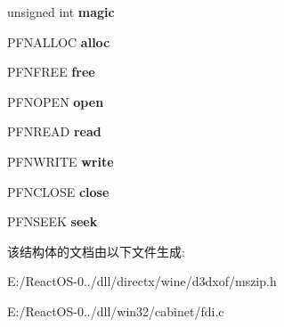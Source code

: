 \begin{DoxyCompactItemize}
\mbox{\label{struct_f_d_i___int_a4dd5be65da967f1874ed28a34d75d856}} 
unsigned int {\bfseries magic}
\item 
\mbox{\label{struct_f_d_i___int_abb67b91c719deb9cdd6ab63e285dd65d}} 
P\+F\+N\+A\+L\+L\+OC {\bfseries alloc}
\item 
\mbox{\label{struct_f_d_i___int_a90057249b8c1b5f56a0779f14433a822}} 
P\+F\+N\+F\+R\+EE {\bfseries free}
\item 
\mbox{\label{struct_f_d_i___int_a00f117b20e15d917435de14d3715902d}} 
P\+F\+N\+O\+P\+EN {\bfseries open}
\item 
\mbox{\label{struct_f_d_i___int_ae523a56a3a8e308727998f71ab767ed6}} 
P\+F\+N\+R\+E\+AD {\bfseries read}
\item 
\mbox{\label{struct_f_d_i___int_a0f2790827a1dda7f74e728a1bdb71b2e}} 
P\+F\+N\+W\+R\+I\+TE {\bfseries write}
\item 
\mbox{\label{struct_f_d_i___int_a51877ef86001941a486032f6414c7216}} 
P\+F\+N\+C\+L\+O\+SE {\bfseries close}
\item 
\mbox{\label{struct_f_d_i___int_ab203c671cb5f5520cac182286c15d144}} 
P\+F\+N\+S\+E\+EK {\bfseries seek}
\end{DoxyCompactItemize}


该结构体的文档由以下文件生成\+:\begin{DoxyCompactItemize}
\item 
E\+:/\+React\+O\+S-\/0../dll/directx/wine/d3dxof/mszip.\+h\item 
E\+:/\+React\+O\+S-\/0../dll/win32/cabinet/fdi.\+c\end{DoxyCompactItemize}
